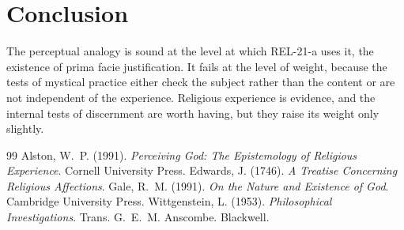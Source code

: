 \documentclass{situationist-preprint}
\begin{document}
\section{Conclusion}

The perceptual analogy is sound at the level at which REL-21-a uses it, the existence of prima facie justification. It fails at the level of weight, because the tests of mystical practice either check the subject rather than the content or are not independent of the experience. Religious experience is evidence, and the internal tests of discernment are worth having, but they raise its weight only slightly.

\begin{thebibliography}{99}\small
{} Alston, W.~P. (1991). \emph{Perceiving God: The Epistemology of Religious Experience}. Cornell University Press.
 Edwards, J. (1746). \emph{A Treatise Concerning Religious Affections}.
 Gale, R.~M. (1991). \emph{On the Nature and Existence of God}. Cambridge University Press.
 Wittgenstein, L. (1953). \emph{Philosophical Investigations}. Trans. G.~E.~M. Anscombe. Blackwell.
\end{thebibliography}
\end{document}
